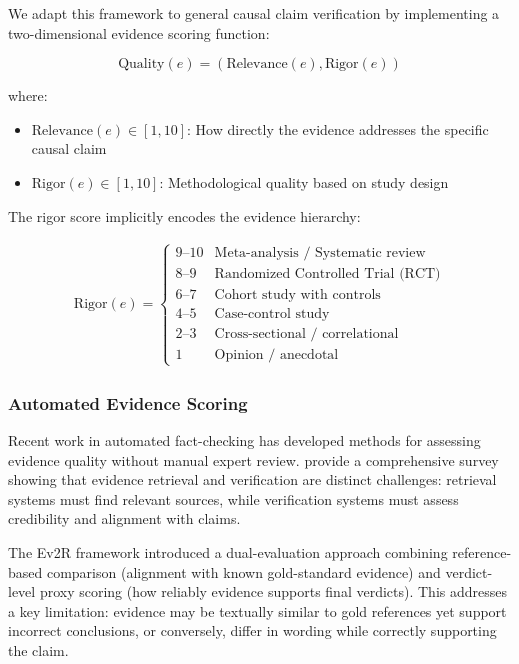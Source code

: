 We adapt this framework to general causal claim verification by implementing a two-dimensional evidence scoring function:

\begin{equation}
\text{Quality}(e) = (\text{Relevance}(e), \text{Rigor}(e))
\label{eq:evidence_quality}
\end{equation}

where:
\begin{itemize}
    \item $\text{Relevance}(e) \in [1, 10]$: How directly the evidence addresses the specific causal claim
    \item $\text{Rigor}(e) \in [1, 10]$: Methodological quality based on study design
\end{itemize}

The rigor score implicitly encodes the evidence hierarchy:

\begin{align}
\text{Rigor}(e) = \begin{cases}
    9\text{--}10 & \text{Meta-analysis / Systematic review} \\
    8\text{--}9 & \text{Randomized Controlled Trial (RCT)} \\
    6\text{--}7 & \text{Cohort study with controls} \\
    4\text{--}5 & \text{Case-control study} \\
    2\text{--}3 & \text{Cross-sectional / correlational} \\
    1 & \text{Opinion / anecdotal}
\end{cases}
\label{eq:rigor_mapping}
\end{align}

\subsubsection{Automated Evidence Scoring}

Recent work in automated fact-checking has developed methods for assessing evidence quality without manual expert review. \citet{automated_factchecking_survey} provide a comprehensive survey showing that evidence retrieval and verification are distinct challenges: retrieval systems must find relevant sources, while verification systems must assess credibility and alignment with claims.

The Ev2R framework \citep{ev2r_evidence_eval} introduced a dual-evaluation approach combining reference-based comparison (alignment with known gold-standard evidence) and verdict-level proxy scoring (how reliably evidence supports final verdicts). This addresses a key limitation: evidence may be textually similar to gold references yet support incorrect conclusions, or conversely, differ in wording while correctly supporting the claim.

